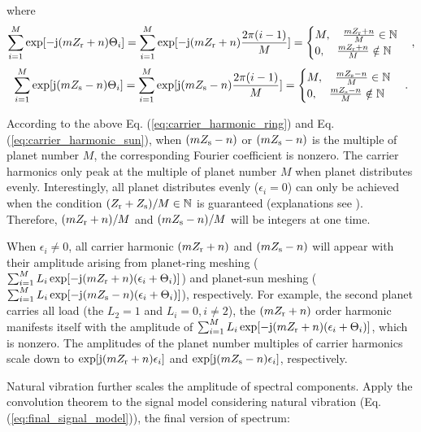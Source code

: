 \documentclass[a4paper,fleqn]{cas-sc}%
\begin{document}
where
\begin{equation}
        \sum_{i=1}^{M} \exp[-{\rm j} (m Z_{\rm r} + n)\Theta_i]=\sum_{i=1}^{M} \exp[-{\rm j}(m Z_{\rm r}+n)\frac{2 \pi (i-1)}{M}]=\begin{cases}
            M, \quad \frac{m Z_{\rm r}+n}{M} \in \mathbb{N}\\
            0, \quad \frac{m Z_{\rm r}+n}{M} \notin \mathbb{N}
        \end{cases},\label{eq:carrier_harmonic_ring}
\end{equation}
\begin{equation}
    \sum_{i=1}^{M} \exp[{\rm j} (m Z_{\rm s} - n)\Theta_i]=\sum_{i=1}^{M} \exp[{\rm j}(m Z_{\rm s}-n)\frac{2 \pi (i-1)}{M}]=\begin{cases}
         M, \quad \frac{m Z_{\rm s}-n}{M} \in \mathbb{N}\\
        0, \quad \frac{m Z_{\rm s}-n}{M} \notin \mathbb{N}
    \end{cases}.\label{eq:carrier_harmonic_sun}
\end{equation}
\par According to the above Eq. (\ref{eq:carrier_harmonic_ring}) and Eq. (\ref{eq:carrier_harmonic_sun}), when $(m Z_{\rm s}-n)$ or $(m Z_{\rm s}-n)$ is the multiple of planet number $M$, the corresponding Fourier coefficient is nonzero. The carrier harmonics only peak at the multiple of planet number $M$ when planet distributes evenly. Interestingly, all planet distributes evenly ($\epsilon_i=0$) can only be achieved when the condition $(Z_{\rm r}+Z_{\rm s})/M \in \mathbb{N}$ is guaranteed (explanations see ). Therefore, $(m Z_{\rm r}+n)/M$ and $(m Z_{\rm s}-n)/M$ will be integers at one time. 
\par When $\epsilon_i \neq 0$, all carrier harmonic $(m Z_{\rm r} + n)$ and $(m Z_{\rm s} - n)$ will appear with their amplitude arising from planet-ring meshing ($\sum_{i=1}^{M} L_i \exp[-{\rm j} (m Z_{\rm r} + n)(\epsilon_i+\Theta_i)]$) and planet-sun meshing ($\sum_{i=1}^{M} L_i \exp[-{\rm j} (m Z_{\rm s} - n)(\epsilon_i+\Theta_i)]$), respectively. For example, the second planet carries all load (the $L_2=1$ and $L_i=0,i\neq2$), the $(m Z_{\rm r} + n)$ order harmonic manifests itself with the amplitude of $\sum_{i=1}^{M} L_i \exp[-{\rm j} (m Z_{\rm r} + n)(\epsilon_i+\Theta_i)]$, which is nonzero. The amplitudes of the planet number multiples of carrier harmonics scale down to $\exp[{\rm j}(m Z_{\rm r}+n)\epsilon_i]$ and $\exp[{\rm j}(m Z_{\rm s}-n)\epsilon_i]$, respectively.
\par Natural vibration further scales the amplitude of spectral components. Apply the convolution theorem to the signal model considering natural vibration (Eq. (\ref{eq:final_signal_model})), the final version of spectrum:
\end{document}
